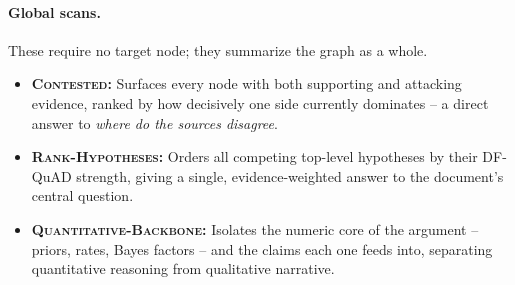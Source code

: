 \documentclass{article}
\begin{document}

\paragraph{Global scans.}
These require no target node; they summarize the graph as a whole.
\begin{itemize}
    \item \textbf{\textsc{Contested}:} Surfaces every node with both supporting and
        attacking evidence, ranked by how decisively one side currently
        dominates -- a direct answer to \emph{where do the sources disagree}.
    \item \textbf{\textsc{Rank-Hypotheses}:} Orders all competing top-level hypotheses
        by their DF-QuAD strength, giving a single, evidence-weighted answer
        to the document's central question.
    \item \textbf{\textsc{Quantitative-Backbone}:} Isolates the numeric core of the
        argument -- priors, rates, Bayes factors -- and the claims each one
        feeds into, separating quantitative reasoning from qualitative
        narrative.
\end{itemize}

\end{document}
